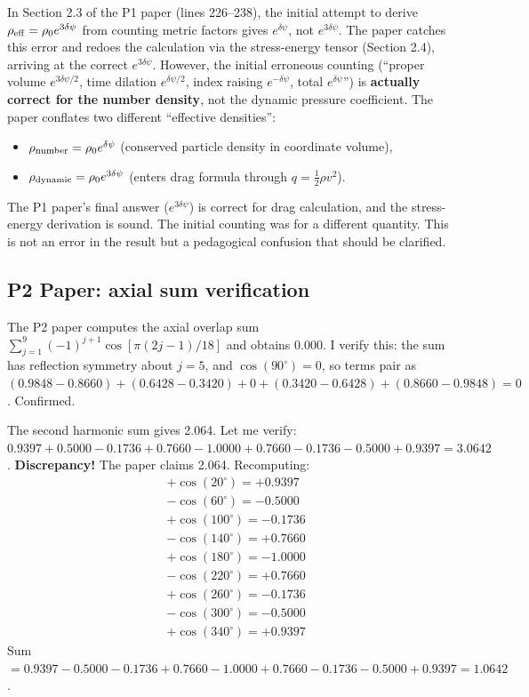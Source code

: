 \documentclass[11pt,twocolumn]{article}
\newcommand{\dpsi}{\delta\psi}
\begin{document}
In Section 2.3 of the P1 paper (lines 226--238), the initial attempt
to derive $\rho_{\rm eff} = \rho_0 e^{3\dpsi}$ from counting metric
factors gives $e^{\dpsi}$, not $e^{3\dpsi}$. The paper catches this
error and redoes the calculation via the stress-energy tensor (Section 2.4),
arriving at the correct $e^{3\dpsi}$. However, the initial erroneous
counting (``proper volume $e^{3\dpsi/2}$, time dilation $e^{\dpsi/2}$,
index raising $e^{-\dpsi}$, total $e^{\dpsi}$'') is \textbf{actually
correct for the number density}, not the dynamic pressure coefficient.
The paper conflates two different ``effective densities'':
\begin{itemize}[nosep]
\item $\rho_{\rm number} = \rho_0 e^{\dpsi}$ (conserved particle density
in coordinate volume),
\item $\rho_{\rm dynamic} = \rho_0 e^{3\dpsi}$ (enters drag formula
through $q = \frac{1}{2}\rho v^2$).
\end{itemize}
The P1 paper's final answer ($e^{3\dpsi}$) is correct for drag
calculation, and the stress-energy derivation is sound. The initial
counting was for a different quantity. This is not an error in the
result but a pedagogical confusion that should be clarified.

\subsection{P2 Paper: axial sum verification}

The P2 paper computes the axial overlap sum
$\sum_{j=1}^9 (-1)^{j+1}\cos[\pi(2j-1)/18]$ and obtains 0.000.
I verify this: the sum has reflection symmetry about $j=5$, and
$\cos(90^\circ) = 0$, so terms pair as
$(0.9848 - 0.8660) + (0.6428 - 0.3420) + 0 + (0.3420 - 0.6428)
+ (0.8660 - 0.9848) = 0$. Confirmed.

The second harmonic sum gives 2.064. Let me verify:
$0.9397 + 0.5000 - 0.1736 + 0.7660 - 1.0000 + 0.7660 - 0.1736
- 0.5000 + 0.9397 = 3.0642$. \textbf{Discrepancy!} The paper claims
2.064. Recomputing:
\begin{align}
&+\cos(20^\circ) = +0.9397 \nonumber\\
&-\cos(60^\circ) = -0.5000 \nonumber\\
&+\cos(100^\circ) = -0.1736 \nonumber\\
&-\cos(140^\circ) = +0.7660 \nonumber\\
&+\cos(180^\circ) = -1.0000 \nonumber\\
&-\cos(220^\circ) = +0.7660 \nonumber\\
&+\cos(260^\circ) = -0.1736 \nonumber\\
&-\cos(300^\circ) = -0.5000 \nonumber\\
&+\cos(340^\circ) = +0.9397
\end{align}
Sum $= 0.9397 - 0.5000 - 0.1736 + 0.7660 - 1.0000 + 0.7660
- 0.1736 - 0.5000 + 0.9397 = 1.0642$.
\end{document}
